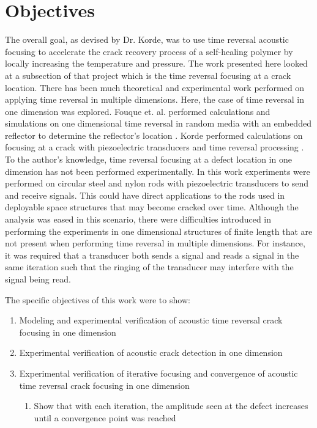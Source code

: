 \section{Objectives}
The overall goal, as devised by Dr. Korde, was to use time reversal acoustic focusing to accelerate the crack recovery process of a self-healing polymer by locally increasing the temperature and pressure. The work presented here looked at a subsection of that project which is the time reversal focusing at a crack location. There has been much theoretical and experimental work performed on applying time reversal in multiple dimensions. Here, the case of time reversal in one dimension was explored. Fouque et. al. performed calculations and simulations on one dimensional time reversal in random media with an embedded reflector to determine the reflector's location \cite{Fouque2006}. Korde performed calculations on focusing at a crack with piezoelectric transducers and time reversal processing \cite{Fehrman2012}. To the author's knowledge, time reversal focusing at a defect location in one dimension has not been performed experimentally. In this work experiments were performed on circular steel and nylon rods with piezoelectric transducers to send and receive signals. This could have direct applications to the rods used in deployable space structures that may become cracked over time. Although the analysis was eased in this scenario, there were difficulties introduced in performing the experiments in one dimensional structures of finite length that are not present when performing time reversal in multiple dimensions. For instance, it was required that a transducer both sends a signal and reads a signal in the same iteration such that the ringing of the transducer may interfere with the signal being read.\newline

The specific objectives of this work were to show:
\begin{enumerate}
\item Modeling and experimental verification of acoustic time reversal crack focusing in one dimension
\item Experimental verification of acoustic crack detection in one dimension
\item Experimental verification of iterative focusing and convergence of acoustic time reversal crack focusing in one dimension
	\begin{enumerate} 
	\item Show that with each iteration, the amplitude seen at the defect increases until a convergence point was reached
	\end{enumerate}

\end{enumerate}